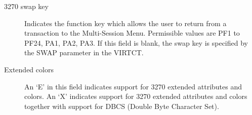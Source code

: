 \documentclass[letterpaper,10pt,english]{sphinxmanual}
\begin{document}
\begin{description}
\item[{3270 swap key}] \leavevmode
Indicates the function key which allows the user to return from a transaction to the Multi-Session Menu. Permissible values are PF1 to PF24, PA1, PA2, PA3. If this field is blank, the swap key is specified by the SWAP parameter in the VIRTCT.

\item[{Extended colors}] \leavevmode
An ‘E’ in this field indicates support for 3270 extended attributes and colors. An ‘X’ indicates support for 3270 extended attributes and colors together with support for DBCS (Double Byte Character Set).

\end{description}

\ignorespaces 
\end{document}
